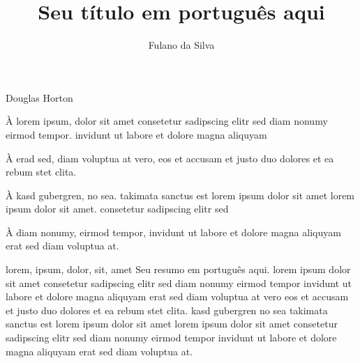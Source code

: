 \documentclass[portuguese,oneside]{tcc}
\author{Fulano da Silva}
\title{Seu título em português aqui}
      {Your title in english here}
\begin{document}

         {Douglas Horton}


\begin{agradecimentos}
À lorem ipsum, dolor sit amet consetetur sadipscing elitr sed diam
nonumy eirmod tempor. invidunt ut labore et dolore magna aliquyam

À erad sed, diam voluptua at vero, eos et accusam et justo duo
dolores et ea rebum stet clita.

À kasd gubergren, no sea. takimata sanctus est lorem ipsum dolor sit
amet lorem ipsum dolor sit amet. consetetur sadipscing elitr sed

À diam nonumy, eirmod tempor, invidunt ut labore et dolore magna
aliquyam erat sed diam voluptua at.
\end{agradecimentos}

\begin{resumo}{lorem, ipsum, dolor, sit, amet}
Seu resumo em português aqui. lorem ipsum dolor sit amet
consetetur sadipscing elitr sed diam nonumy eirmod tempor invidunt
ut labore et dolore magna aliquyam erat sed diam voluptua at vero
eos et accusam et justo duo dolores et ea rebum stet clita.  kasd
gubergren no sea takimata sanctus est lorem ipsum dolor sit amet
lorem ipsum dolor sit amet consetetur sadipscing elitr sed diam
nonumy eirmod tempor invidunt ut labore et dolore magna aliquyam
erat sed diam voluptua at.
\end{resumo}
\end{document}
